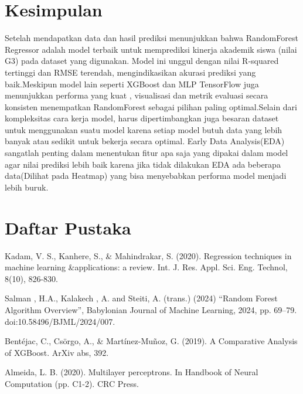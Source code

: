 \chapter*{Kesimpulan}

Setelah mendapatkan data dan hasil prediksi menunjukkan bahwa RandomForest Regressor adalah model terbaik untuk memprediksi kinerja akademik 
siswa (nilai G3) pada dataset yang digunakan. Model ini unggul dengan nilai R-squared tertinggi dan RMSE terendah, mengindikasikan akurasi 
prediksi yang baik.Meskipun model lain seperti XGBoost dan MLP TensorFlow juga menunjukkan performa yang kuat
, visualisasi dan metrik evaluasi secara konsisten menempatkan RandomForest sebagai pilihan paling optimal.Selain dari kompleksitas cara kerja  model, harus 
dipertimbangkan juga besaran dataset untuk menggunakan suatu model karena setiap model butuh data yang lebih banyak atau sedikit untuk bekerja secara optimal.
Early Data Analysis(EDA) sangatlah penting dalam menentukan fitur apa saja yang dipakai dalam model agar nilai prediksi lebih baik karena jika tidak 
dilakukan EDA ada beberapa data(Dilihat pada Heatmap) yang bisa menyebabkan performa model menjadi lebih buruk.

\chapter*{Daftar Pustaka}
Kadam, V. S., Kanhere, S., \& Mahindrakar, S. (2020). Regression techniques in machine learning \&applications: a review. Int. J. Res. Appl. Sci. Eng. Technol, 8(10), 826-830.

Salman , H.A., Kalakech , A. and Steiti, A. (trans.) (2024) “Random Forest Algorithm Overview”, Babylonian Journal of Machine Learning, 2024, pp. 69–79. doi:10.58496/BJML/2024/007.

Bentéjac, C., Csörgo, A., \& Martínez-Muñoz, G. (2019). A Comparative Analysis of XGBoost. ArXiv abs, 392.

Almeida, L. B. (2020). Multilayer perceptrons. In Handbook of Neural Computation (pp. C1-2). CRC Press.

